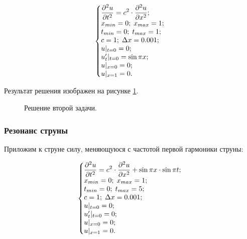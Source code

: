 \documentclass[12pt,a4paper,russian]{report}
\begin{document}
	\begin{equation*}
		\left\{\begin{array}{@{}l@{}}
			\displaystyle \frac{\partial^2u}{\partial t^2} = c^2 \cdot \frac{\partial^2u}{\partial x^2}; \\
			x_{min} = 0; \; x_{max} = 1; \\
			t_{min} = 0; \; t_{max} = 1; \\
			c = 1; \;  \Delta x = 0.001; \\
			u|_{t=0} = 0; \\
			u'_{t}|_{t=0} = \sin \pi x; \\
			u|_{x=0} = 0; \\
			u|_{x=1} = 0.
		\end{array}\right.\,
	\end{equation*}
	
	Результат решения изображен на рисунке \ref{img:second_task}.
	
	\begin{figure}[h]
		\caption{Решение второй задачи.}
		\label{img:second_task}
	\end{figure}
	
	\newpage
	\subsubsection{Резонанс струны}
	
	Приложим к струне силу, меняющуюся с частотой первой гармоники струны:
	
	\begin{equation*}
		\left\{\begin{array}{@{}l@{}}
			\displaystyle \frac{\partial^2u}{\partial t^2} = c^2 \cdot \frac{\partial^2u}{\partial x^2} + \sin \pi x \cdot \sin \pi t; \\
			x_{min} = 0; \; x_{max} = 1; \\
			t_{min} = 0; \; t_{max} = 5; \\
			c = 1; \;  \Delta x = 0.001; \\
			u|_{t=0} = 0; \\
			u'_{t}|_{t=0} = 0; \\
			u|_{x=0} = 0; \\
			u|_{x=1} = 0.
		\end{array}\right.\,
	\end{equation*}
	
\end{document}

